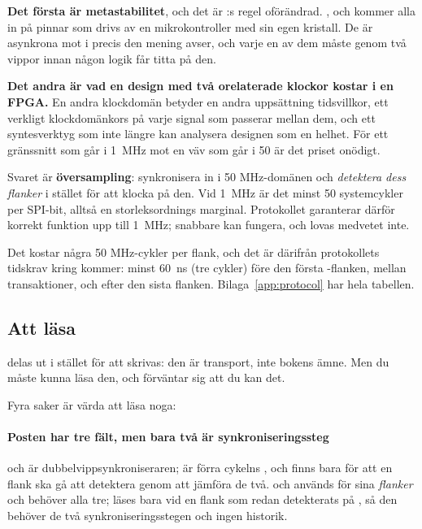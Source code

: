 \textbf{Det första är metastabilitet}, och det är :s regel oförändrad. ,
 och  kommer alla in på pinnar som drivs av en mikrokontroller med sin egen
kristall. De är asynkrona mot  i precis den mening  avser, och varje en av
dem måste genom två vippor innan någon logik får titta på den.

\textbf{Det andra är vad en design med två orelaterade klockor kostar i en FPGA.} En andra klockdomän
betyder en andra uppsättning tidsvillkor, ett verkligt klockdomänkors på varje signal som passerar
mellan dem, och ett syntesverktyg som inte längre kan analysera designen som en helhet. För ett
gränssnitt som går i 1~MHz mot en väv som går i 50 är det priset onödigt.

Svaret är \textbf{översampling}: synkronisera in  i 50 MHz-domänen och \emph{detektera dess
flanker} i stället för att klocka på den. Vid 1~MHz är det minst 50 systemcykler per SPI-bit, alltså
en storleksordnings marginal. Protokollet garanterar därför korrekt funktion upp till 1~MHz; snabbare
kan fungera, och lovas medvetet inte.

Det kostar några 50 MHz-cykler per flank, och det är därifrån protokollets tidskrav kring 
kommer: minst 60~ns (tre cykler) före den första -flanken, mellan transaktioner, och efter
den sista flanken. Bilaga~\ref{app:protocol} har hela tabellen.

\subsection{Att läsa }
\label{c18:sub:slave}

 delas ut i stället för att skrivas: den är transport, inte bokens ämne. Men du måste
kunna läsa den, och  förväntar sig att du kan det.


Fyra saker är värda att läsa noga:

\paragraph{Posten  har tre fält, men bara två är synkroniseringssteg}
 och  är dubbelvippsynkroniseraren;  är förra cykelns , och finns
bara för att en flank ska gå att detektera genom att jämföra de två.  och 
används för sina \emph{flanker} och behöver alla tre;  läses bara vid en flank som redan
detekterats på , så den behöver de två synkroniseringsstegen och ingen historik.

